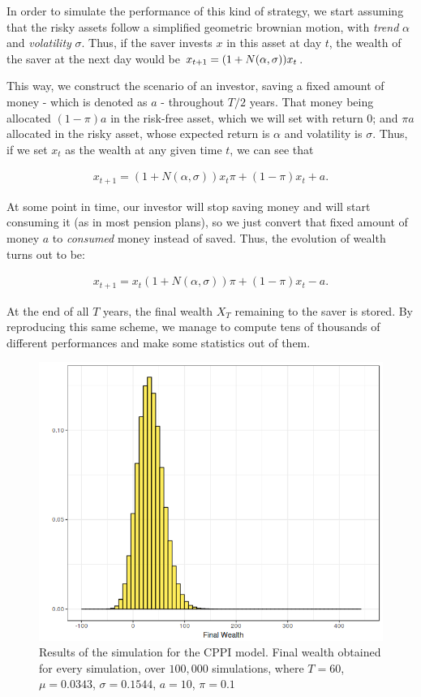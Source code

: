 In order to simulate the performance of this kind of strategy, we start assuming that the risky assets follow a simplified geometric brownian motion, with \emph{trend} $\alpha$ and \emph{volatility} $\sigma$. Thus, if the saver invests $x$ in this asset at day $t$, the wealth of the saver at the next day would be $x_{t+1} = (1 + N\qty(\alpha, \sigma)) x_t$.

This way, we construct the scenario of an investor, saving a fixed amount of money - which is denoted as $a$ -   throughout $T/2$ years. That money being allocated $( 1 - \pi) a$ in the risk-free asset, which we will set with return 0; and $\pi a$ allocated in the risky asset, whose expected return is $\alpha$ and volatility is $\sigma$. Thus, if we set $x_t$ as the wealth at any given time $t$, we can see that

\begin{align}
	x_{t+1} = (1+N(\alpha, \sigma))x_{t}\pi + (1 - \pi)x_{t} + a \textit{.}
\end{align}

At some point in time, our investor will stop saving money and will start consuming it (as in most pension plans), so we just convert that fixed amount of money $a$ to \emph{consumed} money instead of saved. Thus, the evolution of wealth turns out to be:

\begin{align}
	x_{t+1} = x_{t}(1+N(\alpha, \sigma))\pi + (1 - \pi)x_{t} - a \textit{.}
\end{align}

At the end of all $T$ years, the final wealth $X_T$ remaining to the saver is stored. By reproducing this same scheme, we manage to compute tens of thousands of different performances and make some statistics out of them.

\begin{figure}[H]
    \centering
    \includegraphics[scale=0.65]{./images/fw_cppi.png}
    \caption{Results of the simulation for the CPPI model. Final wealth obtained for every simulation, over $100,000$ simulations, where $T=60$, $\mu = 0.0343$, $\sigma = 0.1544$, $a=10$, $\pi = 0.1$}
    \label{fig:cppi_fw}
\end{figure}

